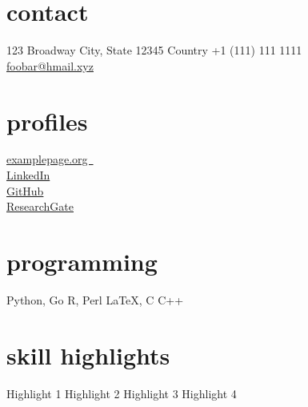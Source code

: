 \documentclass[roboto,custcol]{friggeri-cv}                                       %
\begin{document}

\begin{asidep1}
\section{contact}\vspace{2 mm}
123 Broadway \faMapMarker
City, State 12345
Country
+1 (111) 111 1111 \faPhone\\                                                      %
\href{mailto:foobar@hmail.xyz}{foobar@hmail.xyz \faEnvelope}\\\vspace{2 mm}       %
\section{profiles}\vspace{2 mm}
\href{https://examplepage.org/}{examplepage.org~\faFirefox}\\                     %
\href{https://www.linkedin.com/}{LinkedIn \faLinkedin}\\                          %
\href{https://github.com/}{GitHub \faGithub}\\                                    %
\href{https://www.researchgate.net/}{ResearchGate \faUniversity}\\\vspace{2 mm}     %
\section{programming}\vspace{2 mm}
Python, Go
R, Perl
\LaTeX , C
C++\vspace{2 mm}
\section{skill highlights}\vspace{2 mm}
Highlight 1
Highlight 2
Highlight 3
Highlight 4
\end{asidep1}
\end{document}
